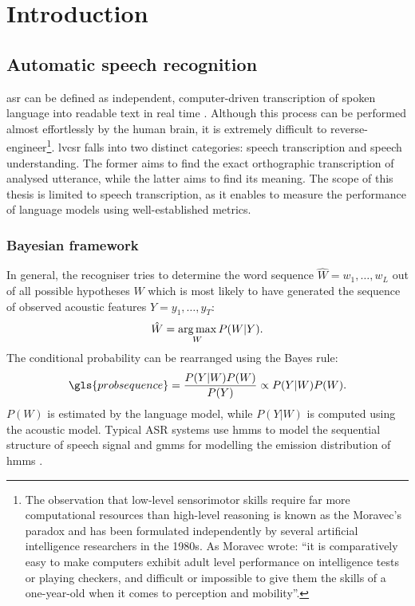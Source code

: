 \chapter{Introduction}
\label{chapter:intro}

\section{Automatic speech recognition}
\label{section:asr}
\Gls{asr} can be defined as independent, computer-driven transcription of spoken language into readable text in real time \cite{stuckless1994developments, jelinek1997statistical}. Although this process can be performed almost effortlessly by the human brain, it is extremely difficult to reverse-engineer\footnote{The observation that low-level sensorimotor skills require far more computational resources than high-level reasoning is known as the Moravec's paradox and has been formulated independently by several artificial intelligence researchers in the 1980s. As Moravec wrote: ``it is comparatively easy to make computers exhibit adult level performance on intelligence tests or playing checkers, and difficult or impossible to give them the skills of a one-year-old when it comes to perception and mobility''\cite{moravec1988mind}.}. \Gls{lvcsr} falls into two distinct categories: speech transcription and speech understanding. The former aims to find the exact orthographic transcription of analysed utterance, while the latter aims to find its meaning. The scope of this thesis is limited to speech transcription, as it enables to measure the performance of language models using well-established metrics.

\subsection{Bayesian framework}
In general, the recogniser tries to determine the word sequence $\hat{W}=w_{1}, \ldots, w_{L}$ out of all possible hypotheses $W$ which is most likely to have generated the sequence of observed acoustic features $Y=y_{1}, \ldots, y_{T}$:
\begin{equation}
\label{equation:recogniser}
  \hat{W}=\operatorname*{arg\, max}_{W}P(W|Y).
\end{equation}
The conditional probability can be rearranged using the Bayes rule:
\begin{equation}
  \label{equation:bayesian}
  \gls{probsequence}=\frac{P(Y|W)P(W)}{P(Y)}\propto{P(Y|W)P(W)}.
\end{equation}
$P(W)$ is estimated by the language model, while $P(Y|W)$ is computed using the acoustic model. Typical ASR systems use \glspl{hmm} to model the sequential structure of speech signal and \glspl{gmm} for modelling the emission distribution of \glspl{hmm} \cite{baker1975dragon, bourlard1994connectionist}.


